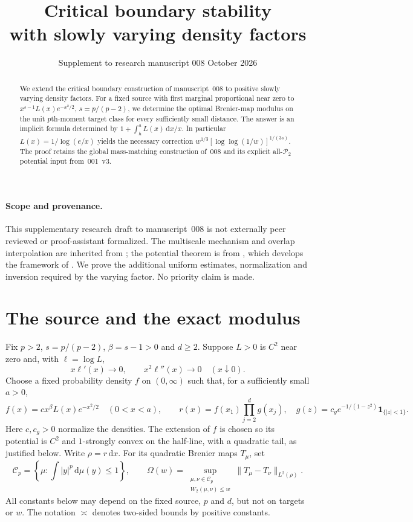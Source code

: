 \documentclass[11pt]{article}
\title{Critical boundary stability\\with slowly varying density factors}
\author{}
\date{Supplement to research manuscript 008\quad 7 October 2026}
\theoremstyle{remark}\newtheorem{remark}[theorem]{Remark}
\newcommand{\dd}{\,\mathrm d}
\newcommand{\ind}{\mathbf1}
\newcommand{\norm}[1]{\lVert#1\rVert}
\begin{document}
\maketitle\vspace{-1.5em}
\begin{abstract}
We extend the critical boundary construction of manuscript~008 to positive slowly varying density factors. For a fixed source with first marginal proportional near zero to $x^{s-1}L(x)e^{-x^2/2}$, $s=p/(p-2)$, we determine the optimal Brenier-map modulus on the unit $p$th-moment target class for every sufficiently small distance. The answer is an implicit formula determined by $1+\int_h^a L(x)\dd x/x$. In particular $L(x)=1/\log(e/x)$ yields the necessary correction $w^{1/3}[\log\log(1/w)]^{1/(3s)}$. The proof retains the global mass-matching construction of~008 and its explicit all-$\mathcal P_2$ potential input from~001~v3.
\end{abstract}

\paragraph{Scope and provenance.}
This supplementary research draft to manuscript~008 is not externally peer reviewed or proof-assistant formalized. The multiscale mechanism and overlap interpolation are inherited from \cite{Overlap}; the potential theorem is from \cite{Potential}, which develops the framework of \cite{OpenAI}. We prove the additional uniform estimates, normalization and inversion required by the varying factor. No priority claim is made.

\section{The source and the exact modulus}
Fix $p>2$, $s=p/(p-2)$, $\beta=s-1>0$ and $d\ge2$. Suppose $L>0$ is $C^2$ near zero and, with $\ell=\log L$,
\begin{equation}\label{eq:slow}
 x\ell'(x)\longrightarrow0,\qquad x^2\ell''(x)\longrightarrow0
 \quad(x\downarrow0).
\end{equation}
Choose a fixed probability density $f$ on $(0,\infty)$ such that, for a sufficiently small $a>0$,
\begin{equation}\label{eq:source}
 f(x)=c x^\beta L(x)e^{-x^2/2}\quad(0<x<a),
 \qquad r(x)=f(x_1)\prod_{j=2}^d g(x_j),\quad
 g(z)=c_g e^{-1/(1-z^2)}\ind_{\{|z|<1\}}.
\end{equation}
Here $c,c_g>0$ normalize the densities. The extension of $f$ is chosen so its potential is $C^2$ and $1$-strongly convex on the half-line, with a quadratic tail, as justified below. Write $\rho=r\dd x$. For its quadratic Brenier maps $T_\mu$, set
\[
 \mathcal C_p=\left\{\mu:\int|y|^p\dd\mu(y)\le1\right\},
 \qquad
 \Omega(w)=\sup_{\substack{\mu,\nu\in\mathcal C_p\\W_2(\mu,\nu)\le w}}
       \norm{T_\mu-T_\nu}_{L^2(\rho)}.
\]
All constants below may depend on the fixed source, $p$ and $d$, but not on targets or $w$. The notation $\asymp$ denotes two-sided bounds by positive constants.
\end{document}
